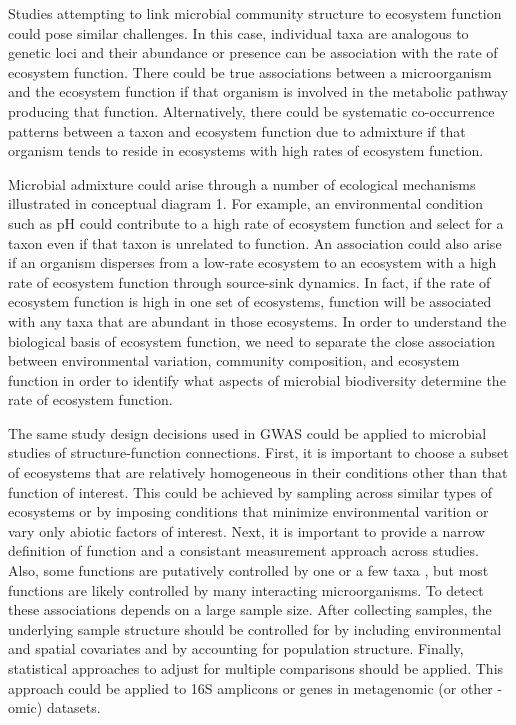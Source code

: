 \documentclass{article}
\begin{document}
Studies attempting to link microbial community structure to ecosystem function
could pose similar challenges. In this case, individual taxa are analogous to
genetic loci and their abundance or presence can be association with the rate of 
ecosystem function. There
could be true associations between a microorganism and the ecosystem function if
that organism is involved in the metabolic pathway producing that function.
Alternatively, there 
could be systematic co-occurrence patterns between a taxon and ecosystem
function due to admixture if that organism tends to reside in ecosystems with
high rates of ecosystem function.

Microbial admixture could arise through a
number of ecological mechanisms illustrated in conceptual diagram 1. For
example, an environmental condition such as pH could contribute to a high rate
of ecosystem function and select for a taxon even if that taxon is unrelated to
function. An association could also arise if an organism disperses from a
low-rate ecosystem to an ecosystem with a high rate of ecosystem function
through source-sink dynamics. In fact, if the rate of
ecosystem function is high in one set of ecosystems, function will be
associated with any taxa that are abundant in those ecosystems.
In order to understand the biological basis of ecosystem function, we need to
separate the close association between environmental variation, community
composition, and ecosystem function in order to identify what aspects of
microbial biodiversity determine the rate of ecosystem function.


The same study design decisions used in GWAS could be applied to microbial
studies of structure-function connections. First, it is important to choose a 
subset of ecosystems that are relatively homogeneous in their conditions other
than that function of interest. This could be achieved by sampling across
similar types of ecosystems or by imposing conditions that minimize
environmental varition or vary only abiotic factors of interest. Next, it is important to provide a narrow
definition of function and a consistant measurement approach across studies.
Also, some functions are putatively controlled by one or a few taxa
\citep{mccalley2014}, but most functions are likely controlled by many
interacting microorganisms. To detect these associations depends on a large
sample size. After collecting samples, the underlying sample structure should be
controlled for by including environmental and spatial covariates and by
accounting for population structure. Finally, statistical approaches to adjust
for multiple comparisons should be applied. This approach could be applied to 16S amplicons or
genes in metagenomic (or other -omic) datasets. 
\end{document}
